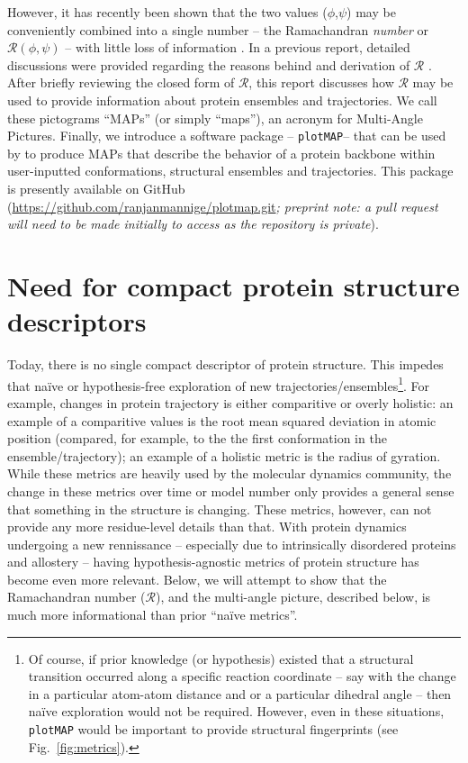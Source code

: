 \documentclass[fleqn,10pt]{wlpeerj} %
\newcommand{\Fig}[1]{Fig.~\ref{#1}}
\newcommand{\pname}{\texttt{plotMAP}\xspace}
\begin{document}
However, it has recently been shown that the two values ($\phi$,$\psi$) may be conveniently combined into a single number -- the Ramachandran \textit{number} or $\mathcal{R}(\phi,\psi)$ -- with little loss of information \citep{MannigeKunduWhitelam2016}. 
In a previous report, detailed discussions were provided regarding the reasons behind and derivation of $\mathcal{R}$ \citep{MannigeKunduWhitelam2016}. After briefly reviewing the closed form of $\mathcal{R}$, this report discusses how $\mathcal{R}$ may be used to provide information about protein ensembles and trajectories. We call these pictograms ``MAPs'' (or simply ``maps''), an acronym for Multi-Angle Pictures. Finally, we introduce a software package -- \pname -- that can be used by to produce MAPs that describe the behavior of a protein backbone within user-inputted conformations, structural ensembles and trajectories. This package is presently available on GitHub (\url{https://github.com/ranjanmannige/plotmap.git}\textit{; preprint note: a pull request will need to be made initially to access as the repository is private}).

\section*{Need for compact protein structure descriptors}

Today, there is no single compact descriptor of protein structure. This impedes that na{\"i}ve or hypothesis-free exploration of new trajectories/ensembles\footnote{Of course, if prior knowledge (or hypothesis) existed that a structural transition occurred along a specific reaction coordinate -- say with the change in a particular atom-atom distance and or a particular dihedral angle -- then na{\"i}ve exploration would not be required. However, even in these situations, \pname would be important to provide structural fingerprints (see \Fig{fig:metrics}).}. For example, changes in protein trajectory is either comparitive or overly holistic: an example of a comparitive values is the root mean squared deviation in atomic position (compared, for example, to the the first conformation in the ensemble/trajectory);  an example of a holistic metric is the radius of gyration. While these metrics are heavily used by the molecular dynamics community, the change in these metrics over time or model number only provides a general sense that something in the structure is changing. These metrics, however, can not provide any more residue-level details than that. With protein dynamics undergoing a new rennissance -- especially due to intrinsically disordered proteins and allostery -- having hypothesis-agnostic metrics of protein structure has become even more relevant. Below, we will attempt to show that the Ramachandran number ($\mathcal{R}$), and the multi-angle picture, described below, is much more informational than prior ``na{\"i}ve metrics''.
\end{document}
